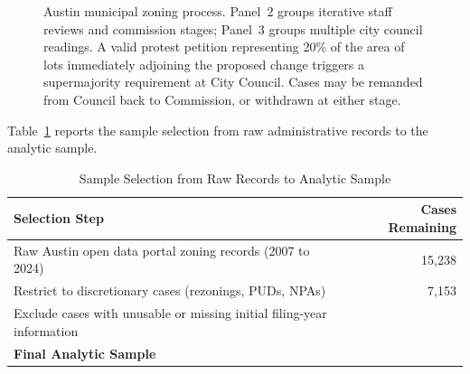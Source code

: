 \documentclass[11pt, letterpaper, oneside]{article}
\begin{document}
\begin{figure}[!htbp]
{%
}
\caption[Austin Municipal Zoning Process]{Austin municipal zoning process. Panel~2 groups iterative staff reviews and commission stages; Panel~3 groups multiple city council readings. A valid protest petition representing 20\% of the area of lots immediately adjoining the proposed change triggers a supermajority requirement at City Council. Cases may be remanded from Council back to Commission, or withdrawn at either stage.}
\label{fig:flowchart}
\end{figure}

Table~\ref{tab:attrition} reports the sample selection from raw administrative records to the analytic sample.

\begin{table}[!htbp]
\centering
\caption{Sample Selection from Raw Records to Analytic Sample}
\label{tab:attrition}
\begin{tabular}{l r}
\toprule
\textbf{Selection Step} & \textbf{Cases Remaining} \\
\midrule
Raw Austin open data portal zoning records (2007 to 2024) & 15,238 \\
Restrict to discretionary cases (rezonings, PUDs, NPAs) & 7,153 \\
Exclude cases with unusable or missing initial filing-year information & \metricBaselineCases{} \\
\midrule
\textbf{Final Analytic Sample} & \textbf{\metricBaselineCases{}} \\
\bottomrule
\end{tabular}
\end{table}
\end{document}
